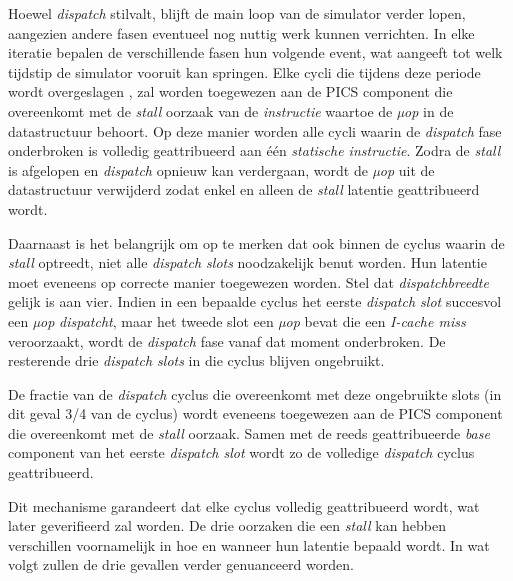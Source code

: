 \documentclass[12pt,a4paper,faculty=ea,language=nl]{ugent-doc}
\begin{document}
Hoewel \textit{dispatch} stilvalt, blijft de main loop van de simulator verder lopen, aangezien andere fasen eventueel nog nuttig werk kunnen verrichten. In elke iteratie bepalen de verschillende fasen hun volgende event,
wat aangeeft tot welk tijdstip de simulator vooruit kan springen. Elke cycli die tijdens deze periode wordt overgeslagen , zal worden toegewezen aan de PICS component die overeenkomt met de \textit{stall} oorzaak van de \textit{instructie} waartoe de \textit{µop} in de datastructuur behoort.
Op deze manier worden alle cycli waarin de \textit{dispatch} fase onderbroken is volledig geattribueerd aan één \textit{statische instructie}. Zodra de \textit{stall} is afgelopen en \textit{dispatch} opnieuw kan verdergaan, wordt de \textit{µop} uit de datastructuur verwijderd zodat enkel en alleen de \textit{stall} latentie geattribueerd wordt.

Daarnaast is het belangrijk om op te merken dat ook binnen de cyclus waarin de \textit{stall} optreedt, niet alle \textit{dispatch slots} noodzakelijk benut worden. Hun latentie moet eveneens op correcte manier toegewezen worden. Stel dat \textit{dispatchbreedte} gelijk is aan vier. Indien in een bepaalde cyclus het eerste \textit{dispatch slot} succesvol een \textit{µop} \textit{dispatcht}, maar het tweede slot
een \textit{µop} bevat die een \textit{I-cache miss} veroorzaakt, wordt de \textit{dispatch} fase vanaf dat moment onderbroken. De resterende drie \textit{dispatch slots} in die cyclus blijven ongebruikt.

De fractie van de \textit{dispatch} cyclus die overeenkomt met deze ongebruikte slots (in dit geval 3/4 van de cyclus) wordt eveneens toegewezen aan de PICS component die overeenkomt met de \textit{stall} oorzaak.
Samen met de reeds geattribueerde \textit{base} component van het eerste \textit{dispatch slot} wordt zo de volledige \textit{dispatch} cyclus geattribueerd.


Dit mechanisme garandeert dat elke cyclus volledig geattribueerd wordt, wat later geverifieerd zal worden. De drie oorzaken die een \textit{stall} kan hebben verschillen voornamelijk in hoe en wanneer hun latentie bepaald wordt.
In wat volgt zullen de drie gevallen verder genuanceerd worden.
\end{document}
